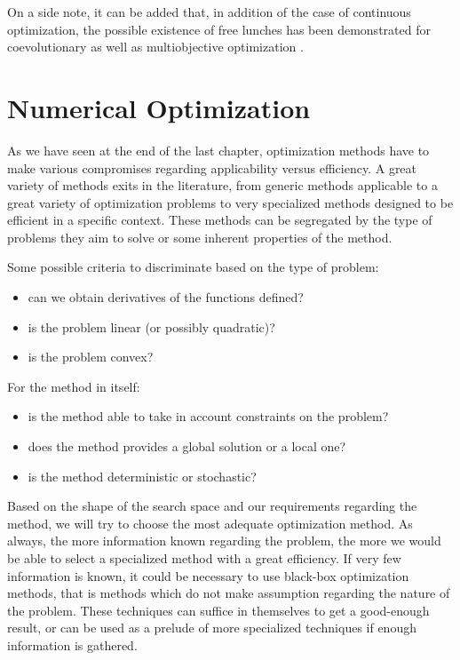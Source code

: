 On a side note, it can be added that, in addition of the case of continuous optimization, the possible existence of free lunches has been demonstrated for coevolutionary \cite{1545946} as well as multiobjective optimization \cite{1299403}.

\chapter{Numerical Optimization}

As we have seen at the end of the last chapter, optimization methods have to make various compromises regarding applicability versus efficiency.  A great variety of methods exits in the literature, from generic methods applicable to a great variety of optimization problems to very specialized methods designed to be efficient in a specific context. These methods can be segregated by the type of problems they aim to solve or some inherent properties of the method.

Some possible criteria to discriminate based on the type of problem:
\begin{itemize}
\item can we obtain derivatives of the functions defined?
\item is the problem linear (or possibly quadratic)?
\item is the problem convex?
\end{itemize}

For the method in itself:
\begin{itemize}
\item is the method able to take in account constraints on the problem?
\item does the method provides a global solution or a local one?
\item is the method deterministic or stochastic?
\end{itemize}

Based on the shape of the search space and our requirements regarding the method, we will try to choose the most adequate optimization method. As always, the more information known regarding the problem, the more we would be able to select a specialized method with a great efficiency. If very few information is known, it could be necessary to use black-box optimization methods, that is methods which do not make assumption regarding the nature of the problem. These techniques can suffice in themselves to get a good-enough result, or can be used as a prelude of more specialized techniques if enough information is gathered.

